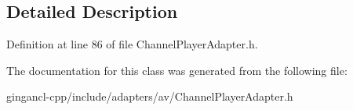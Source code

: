 \subsection{Detailed Description}




Definition at line 86 of file ChannelPlayerAdapter.h.

The documentation for this class was generated from the following file:\begin{CompactItemize}
\item 
gingancl-cpp/include/adapters/av/ChannelPlayerAdapter.h\end{CompactItemize}
